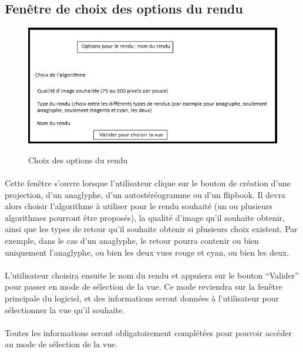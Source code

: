 \subsection{Fenêtre de choix des options du rendu}

\begin{figure}[H]
  \centering
  \includegraphics{choixoptionsrendu}
  \label{fig:optionsrendu}
  \caption{Choix des options du rendu}
\end{figure}

\paragraph{}
Cette fenêtre s’ouvre lorsque l’utilisateur clique sur le bouton de création d’une projection, d’un anaglyphe, d’un autostéréogramme ou d’un flipbook. Il devra alors choisir l’algorithme à utiliser pour le rendu souhaité (un ou plusieurs algorithmes pourront être proposés), la qualité d’image qu’il souhaite obtenir, ainsi que les types de retour qu’il souhaite obtenir si plusieurs choix existent. Par exemple, dans le cas d’un anaglyphe, le retour pourra contenir ou bien uniquement l’anaglyphe, ou bien les deux vues rouge et cyan, ou bien les deux.

\paragraph{}
L’utilisateur choisira ensuite le nom du rendu et appuiera sur le bouton ``Valider'' pour passer en mode de sélection de la vue. Ce mode reviendra sur la fenêtre principale du logiciel, et des informations seront données à l’utilisateur pour sélectionner la vue qu’il souhaite.

\paragraph{}
Toutes les informations seront obligatoirement complétées pour pouvoir accéder au mode de sélection de la vue.

